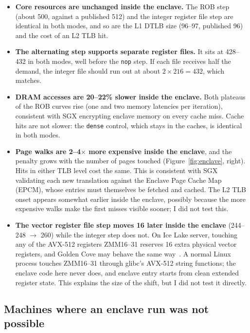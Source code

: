 \documentclass[11pt]{article}
\begin{document}
\begin{itemize}
\item \textbf{Core resources are unchanged inside the enclave.} The ROB
  step (about 500, against a published 512) and the integer register file
  step are identical in both modes, and so are the L1 DTLB size (96--97,
  published 96) and the cost of an L2 TLB hit.
\item \textbf{The alternating step supports separate register files.} It
  sits at 428--432 in both modes, well before the \texttt{nop} step. If each
  file receives half the demand, the integer file should run out at about
  $2 \times 216 = 432$, which matches.
\item \textbf{DRAM accesses are 20--22\% slower inside the enclave.} Both
  plateaus of the ROB curves rise (one and two memory latencies per
  iteration), consistent with SGX encrypting enclave memory on every cache
  miss. Cache hits are not slower: the \texttt{dense} control, which stays in
  the caches, is identical in both modes.
\item \textbf{Page walks are 2--4$\times$ more expensive inside the enclave},
  and the penalty grows with the number of pages touched (Figure~\ref{fig:enclave},
  right). Hits in either TLB level cost the same. This is consistent with
  SGX validating each new translation against the Enclave Page Cache Map
  (EPCM), whose entries must themselves be fetched and cached. The L2 TLB
  onset appears somewhat earlier inside the enclave, possibly because the
  more expensive walks make the first misses visible sooner; I did not test
  this.
\item \textbf{The vector register file step moves 16 later inside the
  enclave} (244--248 $\to$ 260) while the integer step does not. On Ice Lake
  server, touching any of the AVX-512 registers ZMM16--31 reserves 16 extra
  physical vector registers, and Golden Cove may behave the same
  way~\cite{cnc-spr-vrf}. A normal Linux process touches ZMM16--31 through
  glibc's AVX-512 string functions; the enclave code here never does, and
  enclave entry starts from clean extended register state. This explains
  the size of the shift, but I did not test it directly.
\end{itemize}

\subsection{Machines where an enclave run was not possible}
\label{sec:noenclave}
\end{document}
